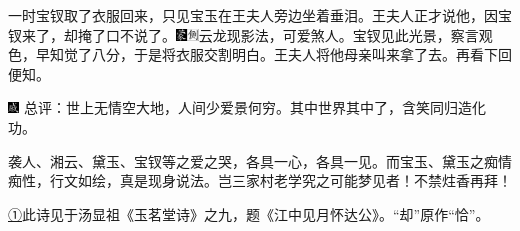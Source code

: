 一时宝钗取了衣服回来，只见宝玉在王夫人旁边坐着垂泪。王夫人正才说他，因宝钗来了，却掩了口不说了。{\includegraphics[width=3mm]{../Images/00006}\includegraphics[width=3mm]{../Images/00011}\footnotesize \kaishu 云龙现影法，可爱煞人。}宝钗见此光景，察言观色，早知觉了八分，于是将衣服交割明白。王夫人将他母亲叫来拿了去。再看下回便知。

{\includegraphics[width=3mm]{../Images/00005}  \kaishu 总评：世上无情空大地，人间少爱景何穷。其中世界其中了，含笑同归造化功。}

{袭人、湘云、黛玉、宝钗等之爱之哭，各具一心，各具一见。而宝玉、黛玉之痴情痴性，行文如绘，真是现身说法。岂三家村老学究之可能梦见者！不禁炷香再拜！}

{\href{../Text/part0036_split_000.html\#navto_1_a}{①}此诗见于汤显祖《玉茗堂诗》之九，题《江中见月怀达公》。``却''原作``恰''。}
